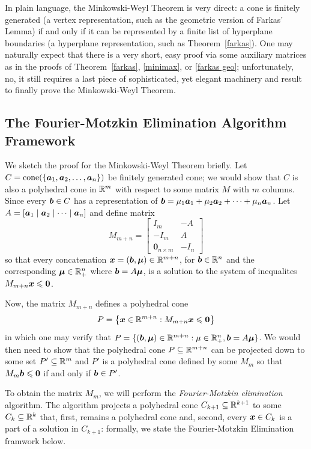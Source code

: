 In plain language, the Minkowski-Weyl Theorem is very direct: a cone is finitely generated (a vertex representation, such as the geometric version of Farkas' Lemma) if and only if it can be represented by a finite list of hyperplane boundaries (a hyperplane representation, such as Theorem~\ref{farkas}). One may naturally expect that there is a very short, easy proof via some auxiliary matrices as in the proofs of Theorem~\ref{farkas}, \ref{minimax}, or \ref{farkas geo}; unfortunately, no, it still requires a last piece of sophisticated, yet elegant machinery and result to finally prove the Minkowski-Weyl Theorem. 

\subsection{The Fourier-Motzkin Elimination Algorithm Framework}

We sketch the proof for the Minkowski-Weyl Theorem briefly. Let $C = \operatorname{cone}(\{{\boldsymbol a}_1, {\boldsymbol a}_2, \dots, {\boldsymbol a}_n\})$ be finitely generated cone; we would show that $C$ is also a polyhedral cone in $\mathbb R^m$ with respect to some matrix $M$ with $m$ columns. Since every ${\boldsymbol b} \in C$ has a representation of ${\boldsymbol b} = \mu_1{\boldsymbol a}_1 + \mu_2{\boldsymbol a}_2 + \dots + \mu_n{\boldsymbol a}_n$. Let $A = [{\boldsymbol a}_1 \mid {\boldsymbol a}_2 \mid \dots \mid {\boldsymbol a}_n]$ and define matrix
\[ M_{m+n} =  \begin{bmatrix} I_m& -A\\ -I_m & A \\ \bm0_{n\times m} & -I_n \end{bmatrix} \] 
so that every concatenation ${\boldsymbol x} = ({\boldsymbol b}, {\boldsymbol\mu}) \in\mathbb R^{m + n}$, for ${\boldsymbol b}\in\mathbb R^n$ and the corresponding ${\boldsymbol\mu} \in\mathbb R^n_+$ where ${\boldsymbol b} = A{\boldsymbol\mu}$, is a solution to the system of inequalites $M_{m+n}{\boldsymbol x} \leqslant\boldsymbol0$. 

Now, the matrix $M_{m+n}$ defines a polyhedral cone 
\[ P = \left\{{\boldsymbol x}\in\mathbb R^{m+n}: M_{m+n}{\boldsymbol x}\leqslant \boldsymbol0 \right\} \] 
in which one may verify that  $P = \{({\boldsymbol b}, {\boldsymbol\mu})\in\mathbb R^{m+n}: \mu\in\mathbb R^n_+, {\boldsymbol b} = A{\boldsymbol\mu}\}$. We would then need to show that the polyhedral cone $P\subseteq\mathbb R^{m+n}$ can be projected down to some set $P' \subseteq \mathbb R^m$ and $P'$ is a polyhedral cone defined by some $M_{m}$ so that $M_m{\boldsymbol b}\leqslant\boldsymbol0$ if and only if ${\boldsymbol b}\in P'$.  

To obtain the matrix $M_m$, we will perform the {\em Fourier-Motzkin elimination} algorithm. The algorithm projects a polyhedral cone $C_{k+1}\subseteq \mathbb R^{k+1}$ to some $C_k\subseteq \mathbb R^{k}$ that, first, remains a polyhedral cone and, second, every ${\boldsymbol x}\in C_k$ is a part of a solution in $C_{k+1}$: formally, we state the Fourier-Motzkin Elimination framwork below. 

